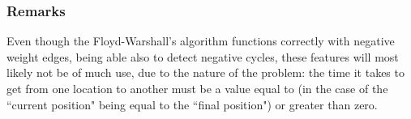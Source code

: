 \subsubsection{Remarks}
Even though the Floyd-Warshall's algorithm functions correctly with negative weight edges, being able also to detect negative cycles, these features will most likely not be of much use, due to the nature of the problem:
the time it takes to get from one location to another must be a value equal to (in the case of the ``current position" being equal to the ``final position") or greater than zero.